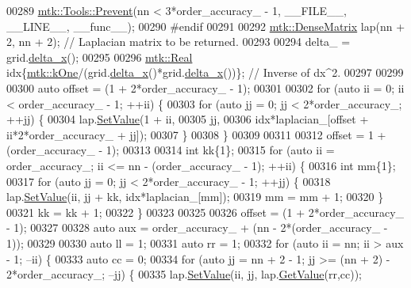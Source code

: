 \begin{DoxyCode}
00289   \hyperlink{classmtk_1_1Tools_a332324c6f25e66be9dff48c5987a3b9f}{mtk::Tools::Prevent}(nn < 3*order\_accuracy\_ - 1, \_\_FILE\_\_, \_\_LINE\_\_, \_\_func\_\_);
00290 \textcolor{preprocessor}{  #endif}
00291 
00292   \hyperlink{classmtk_1_1DenseMatrix}{mtk::DenseMatrix} lap(nn + 2, nn + 2); \textcolor{comment}{// Laplacian matrix to be returned.}
00293 
00294   delta\_ = grid.\hyperlink{classmtk_1_1UniStgGrid1D_a6e7173b01241632cf509496d66b9f74c}{delta\_x}();
00295 
00296   \hyperlink{group__c01-roots_gac080bbbf5cbb5502c9f00405f894857d}{mtk::Real} idx\{\hyperlink{group__c01-roots_ga26407c24d43b6b95480943340d285c71}{mtk::kOne}/(grid.\hyperlink{classmtk_1_1UniStgGrid1D_a6e7173b01241632cf509496d66b9f74c}{delta\_x}()*grid.\hyperlink{classmtk_1_1UniStgGrid1D_a6e7173b01241632cf509496d66b9f74c}{delta\_x}())\}; \textcolor{comment}{// Inverse of
       dx^2.}
00297 
00299 
00300   \textcolor{keyword}{auto} offset = (1 + 2*order\_accuracy\_ - 1);
00301 
00302   \textcolor{keywordflow}{for} (\textcolor{keyword}{auto} ii = 0; ii < order\_accuracy\_ - 1; ++ii) \{
00303     \textcolor{keywordflow}{for} (\textcolor{keyword}{auto} jj = 0; jj < 2*order\_accuracy\_; ++jj) \{
00304       lap.\hyperlink{classmtk_1_1DenseMatrix_a784ce5784109ac86bfb9d8562b334b13}{SetValue}(1 + ii,
00305                    jj,
00306                    idx*laplacian\_[offset + ii*2*order\_accuracy\_ + jj]);
00307     \}
00308   \}
00309 
00311 
00312   offset = 1 + (order\_accuracy\_ - 1);
00313 
00314   \textcolor{keywordtype}{int} kk\{1\};
00315   \textcolor{keywordflow}{for} (\textcolor{keyword}{auto} ii = order\_accuracy\_; ii <= nn - (order\_accuracy\_ - 1); ++ii) \{
00316     \textcolor{keywordtype}{int} mm\{1\};
00317     \textcolor{keywordflow}{for} (\textcolor{keyword}{auto} jj = 0; jj < 2*order\_accuracy\_ - 1; ++jj) \{
00318       lap.\hyperlink{classmtk_1_1DenseMatrix_a784ce5784109ac86bfb9d8562b334b13}{SetValue}(ii, jj + kk, idx*laplacian\_[mm]);
00319       mm = mm + 1;
00320     \}
00321     kk = kk + 1;
00322   \}
00323 
00325 
00326   offset = (1 + 2*order\_accuracy\_ - 1);
00327 
00328   \textcolor{keyword}{auto} aux = order\_accuracy\_ + (nn - 2*(order\_accuracy\_ - 1));
00329 
00330   \textcolor{keyword}{auto} ll = 1;
00331   \textcolor{keyword}{auto} rr = 1;
00332   \textcolor{keywordflow}{for} (\textcolor{keyword}{auto} ii = nn; ii > aux - 1; --ii) \{
00333     \textcolor{keyword}{auto} cc = 0;
00334     \textcolor{keywordflow}{for} (\textcolor{keyword}{auto} jj = nn + 2 - 1; jj >= (nn + 2) - 2*order\_accuracy\_; --jj) \{
00335       lap.\hyperlink{classmtk_1_1DenseMatrix_a784ce5784109ac86bfb9d8562b334b13}{SetValue}(ii, jj, lap.\hyperlink{classmtk_1_1DenseMatrix_a4b23ecbebd970b5eea915dbb50691024}{GetValue}(rr,cc));

\end{DoxyCode}
